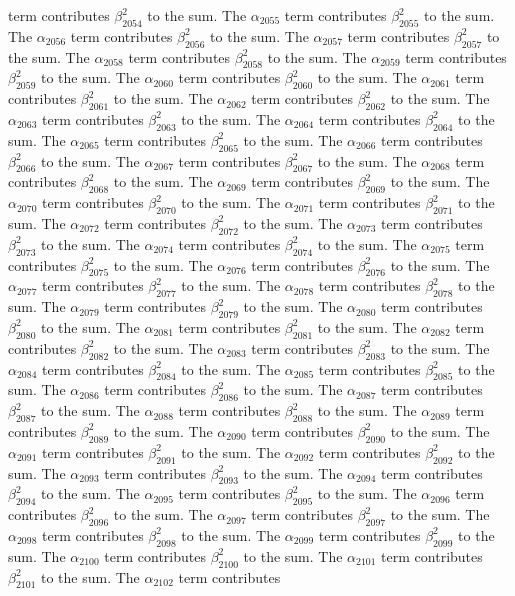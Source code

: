 \begin{lemma}
term contributes $\beta_{2054}^{2}$ to the sum. The $\alpha_{2055}$ term contributes $\beta_{2055}^{2}$ to the sum. The $\alpha_{2056}$ term contributes $\beta_{2056}^{2}$ to the sum. The $\alpha_{2057}$ term contributes $\beta_{2057}^{2}$ to the sum. The $\alpha_{2058}$ term contributes $\beta_{2058}^{2}$ to the sum. The $\alpha_{2059}$ term contributes $\beta_{2059}^{2}$ to the sum. The $\alpha_{2060}$ term contributes $\beta_{2060}^{2}$ to the sum. The $\alpha_{2061}$ term contributes $\beta_{2061}^{2}$ to the sum. The $\alpha_{2062}$ term contributes $\beta_{2062}^{2}$ to the sum. The $\alpha_{2063}$ term contributes $\beta_{2063}^{2}$ to the sum. The $\alpha_{2064}$ term contributes $\beta_{2064}^{2}$ to the sum. The $\alpha_{2065}$ term contributes $\beta_{2065}^{2}$ to the sum. The $\alpha_{2066}$ term contributes $\beta_{2066}^{2}$ to the sum. The $\alpha_{2067}$ term contributes $\beta_{2067}^{2}$ to the sum. The $\alpha_{2068}$ term contributes $\beta_{2068}^{2}$ to the sum. The $\alpha_{2069}$ term contributes $\beta_{2069}^{2}$ to the sum. The $\alpha_{2070}$ term contributes $\beta_{2070}^{2}$ to the sum. The $\alpha_{2071}$ term contributes $\beta_{2071}^{2}$ to the sum. The $\alpha_{2072}$ term contributes $\beta_{2072}^{2}$ to the sum. The $\alpha_{2073}$ term contributes $\beta_{2073}^{2}$ to the sum. The $\alpha_{2074}$ term contributes $\beta_{2074}^{2}$ to the sum. The $\alpha_{2075}$ term contributes $\beta_{2075}^{2}$ to the sum. The $\alpha_{2076}$ term contributes $\beta_{2076}^{2}$ to the sum. The $\alpha_{2077}$ term contributes $\beta_{2077}^{2}$ to the sum. The $\alpha_{2078}$ term contributes $\beta_{2078}^{2}$ to the sum. The $\alpha_{2079}$ term contributes $\beta_{2079}^{2}$ to the sum. The $\alpha_{2080}$ term contributes $\beta_{2080}^{2}$ to the sum. The $\alpha_{2081}$ term contributes $\beta_{2081}^{2}$ to the sum. The $\alpha_{2082}$ term contributes $\beta_{2082}^{2}$ to the sum. The $\alpha_{2083}$ term contributes $\beta_{2083}^{2}$ to the sum. The $\alpha_{2084}$ term contributes $\beta_{2084}^{2}$ to the sum. The $\alpha_{2085}$ term contributes $\beta_{2085}^{2}$ to the sum. The $\alpha_{2086}$ term contributes $\beta_{2086}^{2}$ to the sum. The $\alpha_{2087}$ term contributes $\beta_{2087}^{2}$ to the sum. The $\alpha_{2088}$ term contributes $\beta_{2088}^{2}$ to the sum. The $\alpha_{2089}$ term contributes $\beta_{2089}^{2}$ to the sum. The $\alpha_{2090}$ term contributes $\beta_{2090}^{2}$ to the sum. The $\alpha_{2091}$ term contributes $\beta_{2091}^{2}$ to the sum. The $\alpha_{2092}$ term contributes $\beta_{2092}^{2}$ to the sum. The $\alpha_{2093}$ term contributes $\beta_{2093}^{2}$ to the sum. The $\alpha_{2094}$ term contributes $\beta_{2094}^{2}$ to the sum. The $\alpha_{2095}$ term contributes $\beta_{2095}^{2}$ to the sum. The $\alpha_{2096}$ term contributes $\beta_{2096}^{2}$ to the sum. The $\alpha_{2097}$ term contributes $\beta_{2097}^{2}$ to the sum. The $\alpha_{2098}$ term contributes $\beta_{2098}^{2}$ to the sum. The $\alpha_{2099}$ term contributes $\beta_{2099}^{2}$ to the sum. The $\alpha_{2100}$ term contributes $\beta_{2100}^{2}$ to the sum. The $\alpha_{2101}$ term contributes $\beta_{2101}^{2}$ to the sum. The $\alpha_{2102}$ term contributes 
\end{lemma}
